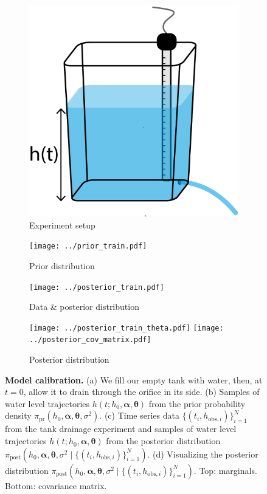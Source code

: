 \documentclass[openacc]{rsproca_new}%
\newcommand\thedata {$\{(t_i,h_{\text{obs}, i})\}_{i=1}^{N}$\xspace}
\newcommand\thedatanomath {\{(t_i,h_{\text{obs}, i})\}_{i=1}^{N}}
\newcommand\themodel {$h(t; h_0, \boldsymbol \alpha, \boldsymbol\theta)$\xspace}
\newcommand\thevars{h_0, \boldsymbol \alpha, \boldsymbol \theta, \sigma^2}
\begin{document}
\begin{figure}[!ht]
    \centering
        \begin{subfigure}[b]{0.22\textwidth}
    	\includegraphics[width=\textwidth]{../tank_geometry/naked_tank.pdf}
	\caption{Experiment setup} \label{fig:naked_tank}
    \end{subfigure}
    
     \begin{subfigure}[b]{0.4\textwidth}
    	\texttt{[image: ../prior\_train.pdf]}
	\caption{Prior distribution} \label{fig:prior_train}
    \end{subfigure}
     \begin{subfigure}[b]{0.4\textwidth}
    	\texttt{[image: ../posterior\_train.pdf]}
	\caption{Data \& posterior distribution} \label{fig:posterior_train}
    \end{subfigure}
    
     \begin{subfigure}[b]{\textwidth}
     \center
    	\texttt{[image: ../posterior\_train\_theta.pdf]}
	\texttt{[image: ../posterior\_cov\_matrix.pdf]}
	\caption{Posterior distribution} \label{fig:posterior_train_theta}
    \end{subfigure}
    \caption{
      \textbf{Model calibration.}
      (a) We fill our empty tank with water, then, at $t=0$, allow it to drain through the orifice in its side.
      (b) Samples of water level trajectories \themodel from the prior probability density $\pi_{\text{pr}}(\thevars)$.
      (c) Time series data \thedata from the tank drainage experiment and samples of water level trajectories \themodel from the posterior distribution $\pi_{\text{post}}(\thevars \mid \thedatanomath)$.
      (d) Visualizing the posterior distribution $\pi_{\text{post}}(\thevars \mid \thedatanomath)$. Top: marginals. Bottom: covariance matrix.      
      }
\end{figure}
\end{document}
